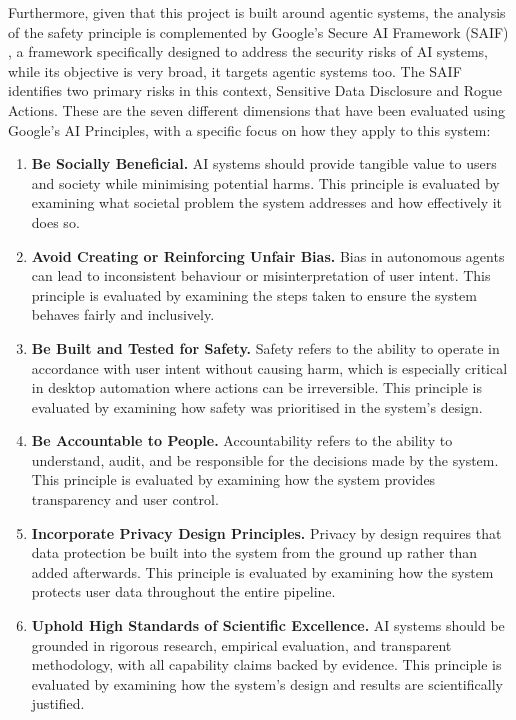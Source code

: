 Furthermore, given that this project is built around agentic systems, the
analysis of the safety principle is complemented by Google's Secure AI Framework
(SAIF) \cite{saif}, a framework specifically designed to address the security
risks of AI systems, while its objective is very broad, it targets agentic
systems too. The SAIF identifies two primary risks in this context, Sensitive
Data Disclosure and Rogue Actions. These are the seven different dimensions that have been evaluated using Google's AI Principles, with a specific focus on how they apply to this system:

\begin{enumerate}

    \item \textbf{Be Socially Beneficial.} AI systems should provide tangible value to users and society while minimising potential harms. This principle is evaluated by examining what societal problem the system addresses and how effectively it does so.

    \item \textbf{Avoid Creating or Reinforcing Unfair Bias.} Bias in autonomous agents can lead to inconsistent behaviour or misinterpretation of user intent. This principle is evaluated by examining the steps taken to ensure the system behaves fairly and inclusively.

    \item \textbf{Be Built and Tested for Safety.} Safety refers to the ability to operate in accordance with user intent without causing harm, which is especially critical in desktop automation where actions can be irreversible. This principle is evaluated by examining how safety was prioritised in the system's design.

    \item \textbf{Be Accountable to People.} Accountability refers to the ability to understand, audit, and be responsible for the decisions made by the system. This principle is evaluated by examining how the system provides transparency and user control.

    \item \textbf{Incorporate Privacy Design Principles.} Privacy by design requires that data protection be built into the system from the ground up rather than added afterwards. This principle is evaluated by examining how the system protects user data throughout the entire pipeline.

    \item \textbf{Uphold High Standards of Scientific Excellence.} AI systems should be grounded in rigorous research, empirical evaluation, and transparent methodology, with all capability claims backed by evidence. This principle is evaluated by examining how the system's design and results are scientifically justified.


\end{enumerate}
